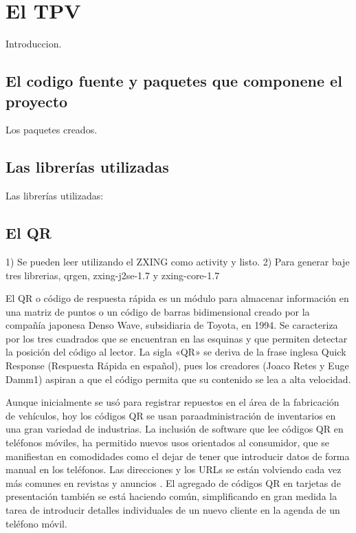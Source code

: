 \chapter{El \acf{TPV}}
\label{cpt:tpv}

Introduccion.

\section{El codigo fuente y paquetes que componene el proyecto}
\label{sec:tpv.packages}

Los paquetes creados.


\section{Las librer\'ias utilizadas}
\label{sec:tpv.libraries}

Las librer\'ias utilizadas:


\section{El \ac{QR}}
\label{sec:tpv.qr}

1) Se pueden leer utilizando el ZXING como activity y listo.
2) Para generar baje tres librerias, qrgen, zxing-j2se-1.7 y zxing-core-1.7

El \ac{QR} o c\'odigo de respuesta rápida es un m\'odulo para almacenar informaci\'on en una matriz de puntos o un c\'odigo de barras bidimensional creado por la compañía japonesa Denso Wave, subsidiaria de Toyota, en 1994. Se caracteriza por los tres cuadrados que se encuentran en las esquinas y que permiten detectar la posici\'on del c\'odigo al lector. La sigla «QR» se deriva de la frase inglesa Quick Response (Respuesta R\'apida en español), pues los creadores (Joaco Retes y Euge Damm1) aspiran a que el c\'odigo permita que su contenido se lea a alta velocidad.


Aunque inicialmente se us\'o para registrar repuestos en el área de la fabricaci\'on de vehículos, hoy los c\'odigos QR se usan paraadministraci\'on de inventarios en una gran variedad de industrias. La inclusi\'on de software que lee c\'odigos QR en teléfonos m\'oviles, ha permitido nuevos usos orientados al consumidor, que se manifiestan en comodidades como el dejar de tener que introducir datos de forma manual en los teléfonos. Las direcciones y los URLs se están volviendo cada vez más comunes en revistas y anuncios . El agregado de c\'odigos QR en tarjetas de presentaci\'on también se está haciendo común, simplificando en gran medida la tarea de introducir detalles individuales de un nuevo cliente en la agenda de un teléfono m\'ovil.

